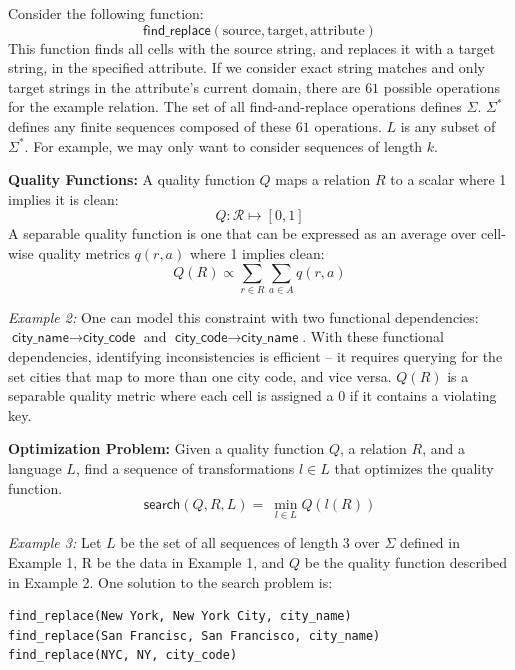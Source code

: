 Consider the following function:
\[
\textsf{find\_replace}(\text{source}, \text{target}, \text{attribute})
\]
This function finds all cells with the source string, and replaces it with a target string, in the specified attribute.
If we consider exact string matches and only target strings in the attribute's current domain, there are $61$ possible operations for the example relation.
The set of all find-and-replace operations defines $\Sigma$.
$\Sigma^*$ defines any finite sequences composed of these $61$ operations.
$L$ is any subset of $\Sigma^*$. 
For example, we may only want to consider sequences of length $k$.



\vspace{0.5em} \noindent \textbf{Quality Functions: } A quality function $Q$ maps a relation $R$ to a scalar where 1 implies it is clean:
\[
Q: \mathcal{R} \mapsto [0,1]
\]
A separable quality function is one that can be expressed as an average over cell-wise quality metrics $q(r,a)$ where 1 implies clean:
\[
Q(R) \propto \sum_{r \in R} \sum_{a \in A} q(r,a)
\]



\vspace{0.5em} \noindent \emph{Example 2: } One can model this constraint with two functional dependencies: $\textsf{city\_name} \rightarrow \textsf{city\_code}$ and $\textsf{city\_code} \rightarrow \textsf{city\_name}$.
With these functional dependencies, identifying inconsistencies is efficient -- it requires querying for the set cities that map to more than one city code, and vice versa. 
$Q(R)$ is a separable quality metric where each cell is assigned a 0  if it contains a violating key. 


\vspace{0.5em} \noindent \textbf{Optimization Problem: } Given a quality function $Q$, a relation $R$, and a language $L$, find a sequence of transformations $l \in L$ that optimizes the quality function.
\[
\textsf{search}(Q,R,L) = ~ \min_{l \in L} Q( l(R) )  
\]

\vspace{0.5em} \noindent \emph{Example 3: } Let $L$ be the set of all sequences of length $3$ over $\Sigma$ defined in Example 1, R be the data in Example 1, and $Q$ be the quality function described in Example 2.
One solution to the search problem is:
\begin{lstlisting}
find_replace(New York, New York City, city_name)
find_replace(San Francisc, San Francisco, city_name)
find_replace(NYC, NY, city_code)
\end{lstlisting}

